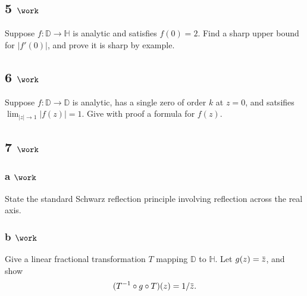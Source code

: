 \hypertarget{work-74}{%
\subsection{\texorpdfstring{5
\(\work\)}{5 \textbackslash work}}\label{work-74}}

Suppose \(f: {\mathbb{D}}\to {\mathbb{H}}\) is analytic and satisfies
\(f(0) = 2\). Find a sharp upper bound for
\({\left\lvert {f'(0)} \right\rvert}\), and prove it is sharp by
example.

\hypertarget{work-75}{%
\subsection{\texorpdfstring{6
\(\work\)}{6 \textbackslash work}}\label{work-75}}

Suppose \(f:{\mathbb{D}}\to{\mathbb{D}}\) is analytic, has a single zero
of order \(k\) at \(z=0\), and satsifies
\(\lim_{{\left\lvert {z} \right\rvert} \to 1} {\left\lvert {f(z)} \right\rvert} = 1\).
Give with proof a formula for \(f(z)\).

\hypertarget{work-76}{%
\subsection{\texorpdfstring{7
\(\work\)}{7 \textbackslash work}}\label{work-76}}

\hypertarget{a-work-1}{%
\subsubsection{\texorpdfstring{a
\(\work\)}{a \textbackslash work}}\label{a-work-1}}

State the standard Schwarz reflection principle involving reflection
across the real axis.

\hypertarget{b-work-1}{%
\subsubsection{\texorpdfstring{b
\(\work\)}{b \textbackslash work}}\label{b-work-1}}

Give a linear fractional transformation \(T\) mapping \({\mathbb{D}}\)
to \({\mathbb{H}}\). Let
\(g(z) = \mkern 1.5mu\overline{\mkern-1.5muz\mkern-1.5mu}\mkern 1.5mu\),
and show
\begin{align*}  
(T^{-1} \circ g \circ T)(z) = 1/\mkern 1.5mu\overline{\mkern-1.5muz\mkern-1.5mu}\mkern 1.5mu
.\end{align*}

